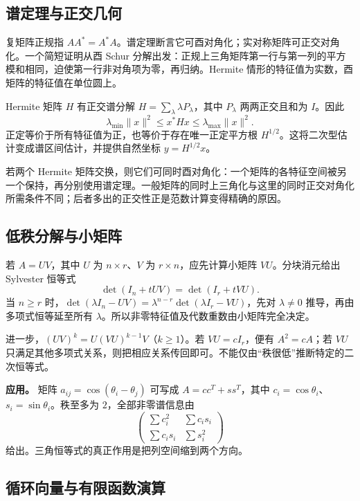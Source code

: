 \documentclass[UTF8,12pt,a4paper,fontset=fandol]{ctexart}
\begin{document}
\subsection{谱定理与正交几何}

\label{app:linear-spectral}

复矩阵正规指 $AA^*=A^*A$。谱定理断言它可酉对角化；实对称矩阵可正交对角化。一个简短证明从酉 Schur 分解出发：正规上三角矩阵第一行与第一列的平方模和相同，迫使第一行非对角项为零，再归纳。Hermite 情形的特征值为实数，酉矩阵的特征值在单位圆上。

Hermite 矩阵 $H$ 有正交谱分解 $H=\sum_\lambda\lambda P_\lambda$，其中 $P_\lambda$ 两两正交且和为 $I$。因此
\[
\lambda_{\min}\|x\|^2\leq x^*Hx\leq\lambda_{\max}\|x\|^2.
\]
正定等价于所有特征值为正，也等价于存在唯一正定平方根 $H^{1/2}$。这将二次型估计变成谱区间估计，并提供自然坐标 $y=H^{1/2}x$。

若两个 Hermite 矩阵交换，则它们可同时酉对角化：一个矩阵的各特征空间被另一个保持，再分别使用谱定理。一般矩阵的同时上三角化与这里的同时正交对角化所需条件不同；后者多出的正交性正是范数计算变得精确的原因。

\subsection{低秩分解与小矩阵}

\label{app:linear-lowrank}

若 $A=UV$，其中 $U$ 为 $n\times r$、$V$ 为 $r\times n$，应先计算小矩阵 $VU$。分块消元给出 Sylvester 恒等式
\[
\det(I_n+tUV)=\det(I_r+tVU).
\]
当 $n\geq r$ 时，$\det(\lambda I_n-UV)=\lambda^{n-r}\det(\lambda I_r-VU)$，先对 $\lambda\neq0$ 推导，再由多项式恒等延至所有 $\lambda$。所以非零特征值及代数重数由小矩阵完全决定。

进一步，$(UV)^k=U(VU)^{k-1}V$（$k\geq1$）。若 $VU=cI_r$，便有 $A^2=cA$；若 $VU$ 只满足其他多项式关系，则把相应关系传回即可。不能仅由“秩很低”推断特定的二次恒等式。

\textbf{应用。} 矩阵 $a_{ij}=\cos(\theta_i-\theta_j)$ 可写成 $A=cc^T+ss^T$，其中 $c_i=\cos\theta_i$、$s_i=\sin\theta_i$。秩至多为 $2$，全部非零谱信息由
\[
\begin{pmatrix}\sum c_i^2&\sum c_is_i\\\sum c_is_i&\sum s_i^2\end{pmatrix}
\]
给出。三角恒等式的真正作用是把列空间缩到两个方向。

\subsection{循环向量与有限函数演算}
\end{document}

